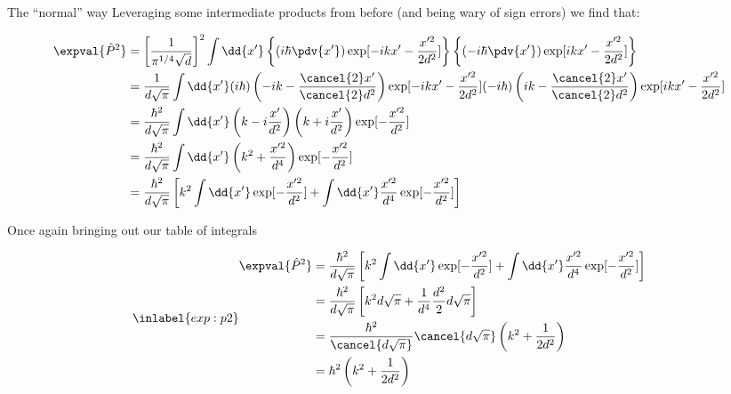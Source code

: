 \begin{answer}
\begin{answerpart}{The ``normal'' way}
    Leveraging some intermediate products from before (and being wary
    of sign errors) we find that:

    \begin{equation}
      \begin{split}
        \expval{\hat{P}^2}
        &=
        \left[\frac{1}{\pi^{1/4}\sqrt{d}}\right]^2
        \int \dd{x'}
        \left\{
        \left(i \hbar \pdv{x'}\right)
        \exp[-ikx' - \frac{x'^{2}}{2d^2}]
        \right\}
        \left\{
        \left(-i \hbar \pdv{x'}\right)
        \exp[ikx' - \frac{x'^{2}}{2d^2}]        
        \right\}
        \\
        &=
        \frac{1}{d\sqrt{\pi}}
        \int \dd{x'}
        (i \hbar)
        \left(
        -ik - \frac{\cancel{2}x'}{\cancel{2}d^2}
        \right)
        \exp[-ikx' - \frac{x'^{2}}{2d^2}]
        (-i \hbar)
        \left(
        ik - \frac{\cancel{2}x'}{\cancel{2}d^2}
        \right)
        \exp[ikx' - \frac{x'^{2}}{2d^2}]
        \\
        &=
        \frac{\hbar^2}{d\sqrt{\pi}}
        \int \dd{x'}
        \left(
        k - i\frac{x'}{d^2}
        \right)
        \left(
        k + i\frac{x'}{d^2}
        \right)
        \exp[-\frac{x'^{2}}{d^2}]
        \\
        &=
        \frac{\hbar^2}{d\sqrt{\pi}}
        \int \dd{x'}
        \left(
        k^2 + \frac{x'^2}{d^4}
        \right)
        \exp[-\frac{x'^{2}}{d^2}]
        \\
        &=
        \frac{\hbar^2}{d\sqrt{\pi}}
        \left[
        k^2
        \int \dd{x'}
        \exp[-\frac{x'^{2}}{d^2}]
        +
        \int \dd{x'}
        \frac{x'^2}{d^4}
        \exp[-\frac{x'^{2}}{d^2}]
        \right]
        \\
      \end{split}
    \end{equation}

    Once again bringing out our table of integrals

    \begin{equation}
      \inlabel{exp:p2}
      \begin{split}
        \expval{\hat{P}^2}
        &=
        \frac{\hbar^2}{d\sqrt{\pi}}
        \left[
        k^2
        \int \dd{x'}
        \exp[-\frac{x'^{2}}{d^2}]
        +
        \int \dd{x'}
        \frac{x'^2}{d^4}
        \exp[-\frac{x'^{2}}{d^2}]
        \right]
        \\
        &=
        \frac{\hbar^2}{d\sqrt{\pi}}
        \left[
        k^2
        d\sqrt{\pi}
        +
        \frac{1}{d^4}
        \frac{d^2}{2}d\sqrt{\pi}
        \right]
        \\
        &=
        \frac{\hbar^2}{\cancel{d\sqrt{\pi}}}
        \cancel{d\sqrt{\pi}}
        \left(
        k^2
        +
        \frac{1}{2d^2}
        \right)
        \\
        &=
        \hbar^2
        \left(
        k^2
        +
        \frac{1}{2d^2}
        \right)
        \\
      \end{split}
    \end{equation}


\end{answerpart}
\end{answer}
